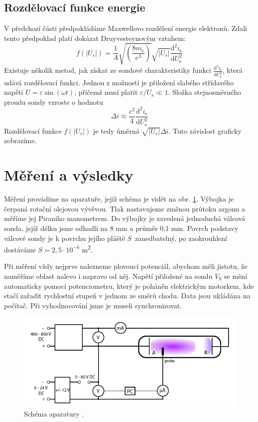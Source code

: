 \documentclass[a4paper,12pt]{article}
\begin{document}
\subsection{Rozdělovací funkce energie}
V předchozí části předpokládáme Maxwellovo rozdělení energie elektronů.
Zdali tento předpoklad platí dokázat Druyvesteynovým vztahem:
\begin{equation}
	f(\vert U_s\vert) = 
	\frac{1}{A}\sqrt{\left(\frac{8m_\text{e}}{e^3}\right)} \sqrt{\vert 
	U_s\vert} \frac{\text{d}^2i_\text{e}}{\text{d}U^2_\text{s}}
\label{Druyvesteyn}
\end{equation}
Existuje několik metod, jak získat ze sondové charakteristiky funkci 
$\frac{\text{d}^2i_\text{e}}{\text{d}U^2_\text{s}}$, která udává rozdělovací 
funkci. Jednou z možností je přiložení slabého střídavého napětí 
$U=\varepsilon\sin(\omega t)$, přičemž musí platit 
$\varepsilon/U_\text{s}\ll1$. Složka stejnosměrného proudu sondy vzroste o 
hodnotu 
\begin{equation}
\Delta i \approx 
\frac{\varepsilon^2}{4}\frac{\text{d}^2i_\text{e}}{\text{d}U^2_\text{s}}
\label{delta i}
\end{equation}
Rozdělovací funkce $f(\vert U_s\vert)$ je tedy úměrná $\sqrt{\vert 
U_s\vert}\Delta i$. Tuto závislost graficky zobrazíme.
\newpage
\section{Měření a výsledky}
Měření provádíme na aparatuře, jejíž schéma je vidět na obr. \ref{schema}. Výbojka je čerpaná rotační olejovou vývěvou. Tlak
nastavujeme změnou průtoku argonu a měříme jej Piraniho manometrem. Do výbojky je zavedená jednoduchá válcová sonda, jejíž délku jsme
odhadli na 8 \si{\milli\meter} a průměr 0,1 \si{\milli\meter}. Povrch podstavy válcové sondy je k povrchu jejího pláště $S$~zanedbatelný, po zaokrouhlení dostáváme $S = 2,5\cdot10^{-6}$ \si{\meter\squared}. 

Při měření vždy nejprve nalezneme plovoucí potenciál, abychom měli jistotu, že naměříme oblast 
nalevo i napravo od něj. Napětí přiložené na sondu $V_\text{S}$ se mění automaticky pomocí 
potenciometru, který je poháněn elektrickým motorkem, kde stačí zařadit rychlostní stupeň v jednom
ze směrů chodu. Data jsou ukládána na počítač. Při vyhodnocování jsme je museli 
synchronizovat.   

\begin{figure}[h]
	\centering
	\includegraphics[width=120mm]{schema.png}
	\caption{Schéma aparatury \cite{VA}.}
	\label{schema}
\end{figure}
\end{document}
